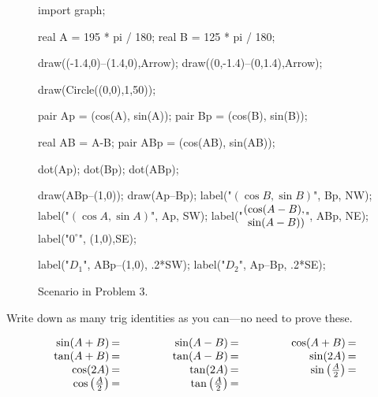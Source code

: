 \documentclass[../gatm_answers.tex]{subfiles}
\begin{document}
\begin{figure}[h]
	\begin{center}
		\begin{minipage}{\textwidth}
			\centering
			\begin{asy}[width=0.5\textwidth]
				import graph;
				
				real A = 195 * pi / 180;
				real B = 125 * pi / 180;
				
				draw((-1.4,0)--(1.4,0),Arrow);
				draw((0,-1.4)--(0,1.4),Arrow);
				
				draw(Circle((0,0),1,50));
				
				pair Ap = (cos(A), sin(A));
				pair Bp = (cos(B), sin(B));
				
				real AB = A-B;
				pair ABp = (cos(AB), sin(AB));
				
				dot(Ap);
				dot(Bp);
				dot(ABp);
				
				draw(ABp--(1,0));
				draw(Ap--Bp);
				label("$(\cos B, \sin B)$", Bp, NW);
				label("$(\cos A, \sin A)$", Ap, SW);
				label("$\arraycolsep=0pt \begin{array}{rl} (& \cos (A-B), \\ & \sin (A-B)) \end{array}$", ABp, NE);
				label("$0^\circ$", (1,0),SE);
				
				label("$D_1$", ABp--(1,0), .2*SW);
				label("$D_2$", Ap--Bp, .2*SE);
			
			\end{asy}
		\end{minipage}
	\end{center}
	
	\begin{center}
		\begin{minipage}{\textwidth}
			\caption{Scenario in Problem 3.}
			\label{fig:unit_circle}
		\end{minipage}
	\end{center}
	\vspace*{-2\baselineskip}
\end{figure}

\begin{outer_problem}
\item Write down as many trig identities as you can---no need to prove these.

\renewcommand{\arraystretch}{1.1}
$$\arraycolsep=1pt\begin{array}{rlrlrl}
\sin(A+B)&=\qquad\qquad\phantom{.}&\sin(A-B) &=\qquad\qquad\phantom{.}&\cos(A+B) &= \\
\tan(A+B)&= &\tan(A-B) &= &\sin(2A) &= \\
\cos(2A)&= &\tan(2A) &= &\sin\left(\frac{A}{2}\right) &= \\
\cos\left(\frac{A}{2}\right)&= &\tan\left(\frac{A}{2}\right) &= & & \\
\end{array}$$
\end{outer_problem}
\end{document}
